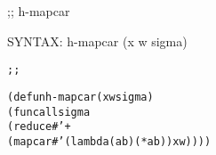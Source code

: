 \begin{aibox}{\function}
;; h-mapcar

SYNTAX: h-mapcar (x w sigma) 
\end{aibox}

\begin{aibox}{\examples}

\end{aibox}

\begin{aibox}{\comments}

\end{aibox}
\begin{aibox}{\answers}

\end{aibox}
\begin{aibox}{\othercomments}

\end{aibox}
\begin{aibox}{\pseudocode}

\end{aibox}
\begin{aibox}{\code}

\begin{alltt}
;;%% code

(defun h-mapcar (x w sigma) 
    (funcall sigma 
        (reduce #'+
            (mapcar #'(lambda (a b) (* a b)) x w))))

\end{alltt}
\end{aibox}
